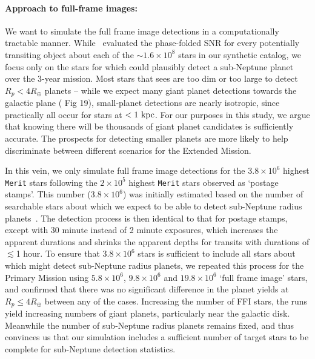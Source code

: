 \paragraph{Approach to full-frame images:}
\label{sec:FFI_simulation}
We want to simulate the full frame image detections in a
computationally tractable manner.  While~
evaluated the phase-folded SNR for every potentially transiting object
about each of the $\sim 1.6\times10^8$ stars in our synthetic catalog,
we focus only on the stars for which \tess could plausibly detect a
sub-Neptune planet over the 3-year mission.  Most stars that
\tess sees are too dim or too large to detect $R_p<4R_\oplus$ planets
-- while we expect many giant planet detections towards the galactic
plane ( Fig 19), small-planet detections are
nearly isotropic, since practically all occur for stars at
$<1\rm\ kpc$.  For our purposes in this study, we argue that knowing
there will be thousands of giant planet candidates is sufficiently
accurate. The prospects for detecting smaller planets are more likely
to help discriminate between different scenarios for the Extended Mission.

In this vein, we only simulate full frame image detections for the
$3.8\times10^6$ highest \texttt{Merit} stars following the
$2\times10^5$ highest \texttt{Merit} stars observed as `postage
stamps'.  This number ($3.8\times10^6$) was initially estimated based
on the number of searchable stars about which we expect \tess to be
able to detect sub-Neptune radius
planets~\citep{winn_searchable_2013}.  The detection process is then
identical to that for postage stamps, except with 30 minute instead of
2 minute exposures, which increases the apparent durations and shrinks
the apparent depths for transits with durations of $\lesssim$1 hour.
To ensure that $3.8\times10^6$ stars is sufficient to include all
stars about which \tess might detect sub-Neptune radius planets, we
repeated this process for the Primary Mission using $5.8\times10^6$,
$9.8\times10^6$ and $19.8\times10^6$ `full frame image' stars, and
confirmed that there was no significant difference in the planet
yields at $R_p\le4R_\oplus$ between any of the cases.
Increasing the number of FFI stars, the runs yield
increasing numbers of giant planets, particularly near the galactic
disk.  Meanwhile the number of sub-Neptune radius planets remains
fixed, and thus convinces us that our simulation includes a sufficient
number of target stars to be complete for sub-Neptune detection statistics.
